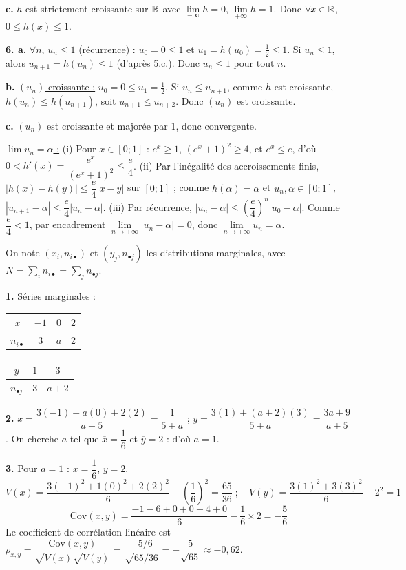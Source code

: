 \documentclass[11pt]{article}
\begin{document}
\textbf{c.} $h$ est strictement croissante sur $\mathbb{R}$ avec $\lim\limits_{-\infty} h = 0$, $\lim\limits_{+\infty} h = 1$. Donc $\forall x \in \mathbb{R}$, $0 \le h(x) \le 1$.

\textbf{6. a.} \underline{$\forall n$, $u_n \le 1$ (récurrence) :} $u_0 = 0 \le 1$ et $u_1 = h(u_0) = \tfrac{1}{2} \le 1$. Si $u_n \le 1$, alors $u_{n+1} = h(u_n) \le 1$ (d'après 5.c.). Donc $u_n \le 1$ pour tout $n$.

\textbf{b.} \underline{$(u_n)$ croissante :} $u_0 = 0 \le u_1 = \tfrac{1}{2}$. Si $u_n \le u_{n+1}$, comme $h$ est croissante, $h(u_n) \le h(u_{n+1})$, soit $u_{n+1} \le u_{n+2}$. Donc $(u_n)$ est croissante.

\textbf{c.} $(u_n)$ est croissante et majorée par 1, donc convergente.

\underline{$\lim u_n = \alpha$ :} (i) Pour $x \in [0;1]$ : $e^x \ge 1$, $(e^x+1)^2 \ge 4$, et $e^x \le e$, d'où $0 < h'(x) = \dfrac{e^x}{(e^x+1)^2} \le \dfrac{e}{4}$. (ii) Par l'inégalité des accroissements finis, $|h(x) - h(y)| \le \dfrac{e}{4}|x - y|$ sur $[0;1]$ ; comme $h(\alpha) = \alpha$ et $u_n, \alpha \in [0;1]$, $|u_{n+1} - \alpha| \le \dfrac{e}{4}|u_n - \alpha|$. (iii) Par récurrence, $|u_n - \alpha| \le \left(\dfrac{e}{4}\right)^n|u_0 - \alpha|$. Comme $\dfrac{e}{4} < 1$, par encadrement $\lim\limits_{n\to+\infty}|u_n - \alpha| = 0$, donc $\lim\limits_{n\to+\infty} u_n = \alpha$.

On note $(x_i, n_{i\bullet})$ et $(y_j, n_{\bullet j})$ les distributions marginales, avec $N = \sum_i n_{i\bullet} = \sum_j n_{\bullet j}$.

\textbf{1.} Séries marginales :
\begin{center}\renewcommand{\arraystretch}{1.3}
\begin{tabular}{|c|c|c|c|}\hline $x$ & $-1$ & $0$ & $2$ \\\hline $n_{i\bullet}$ & 3 & $a$ & 2 \\\hline\end{tabular}\qquad
\begin{tabular}{|c|c|c|}\hline $y$ & $1$ & $3$ \\\hline $n_{\bullet j}$ & 3 & $a+2$ \\\hline\end{tabular}
\end{center}

\textbf{2.} $\overline{x} = \dfrac{3(-1) + a(0) + 2(2)}{a + 5} = \dfrac{1}{5 + a}$ ; $\overline{y} = \dfrac{3(1) + (a+2)(3)}{5 + a} = \dfrac{3a + 9}{a + 5}$. On cherche $a$ tel que $\overline{x} = \dfrac{1}{6}$ et $\overline{y} = 2$ : d'où $a = 1$.

\textbf{3.} Pour $a = 1$ : $\overline{x} = \dfrac{1}{6}$, $\overline{y} = 2$.
\[ V(x) = \frac{3(-1)^2 + 1(0)^2 + 2(2)^2}{6} - \left(\frac{1}{6}\right)^2 = \frac{65}{36} \;;\quad V(y) = \frac{3(1)^2 + 3(3)^2}{6} - 2^2 = 1 \]
\[ \mathrm{Cov}(x,y) = \frac{-1 - 6 + 0 + 0 + 4 + 0}{6} - \frac{1}{6}\times 2 = -\frac{5}{6} \]
Le coefficient de corrélation linéaire est $\rho_{x,y} = \dfrac{\mathrm{Cov}(x,y)}{\sqrt{V(x)}\sqrt{V(y)}} = \dfrac{-5/6}{\sqrt{65/36}} = -\dfrac{5}{\sqrt{65}} \approx -0{,}62$.
\end{document}
